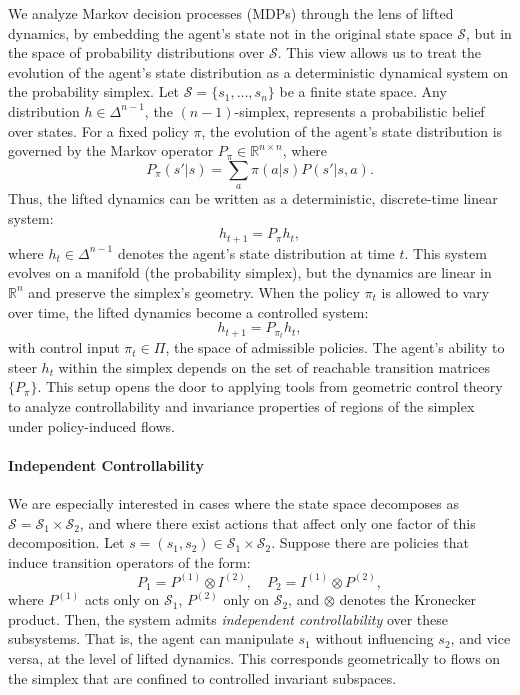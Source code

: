 \documentclass{article}
\theoremstyle{plain}
\theoremstyle{definition}
\theoremstyle{remark}
\begin{document}
We analyze Markov decision processes (MDPs) through the lens of lifted dynamics, by embedding the agent's state not in the original state space \( \mathcal{S} \), but in the space of probability distributions over \( \mathcal{S} \). This view allows us to treat the evolution of the agent's state distribution as a deterministic dynamical system on the probability simplex.
Let \( \mathcal{S} = \{s_1, \dots, s_n\} \) be a finite state space. Any distribution \( h \in \Delta^{n-1} \), the \( (n-1) \)-simplex, represents a probabilistic belief over states. For a fixed policy \( \pi \), the evolution of the agent's state distribution is governed by the Markov operator \( P_\pi \in \mathbb{R}^{n \times n} \), where
\begin{equation}
    P_\pi(s'|s) = \sum_a \pi(a|s) P(s'|s,a).
\end{equation}
Thus, the lifted dynamics can be written as a deterministic, discrete-time linear system:
\begin{equation}
    h_{t+1} = P_\pi h_t,
\end{equation}
where \( h_t \in \Delta^{n-1} \) denotes the agent's state distribution at time \( t \).
This system evolves on a manifold (the probability simplex), but the dynamics are linear in \( \mathbb{R}^n \) and preserve the simplex's geometry.
When the policy \( \pi_t \) is allowed to vary over time, the lifted dynamics become a controlled system:
\begin{equation}
    h_{t+1} = P_{\pi_t} h_t,
\end{equation}
with control input \( \pi_t \in \Pi \), the space of admissible policies. The agent's ability to steer \( h_t \) within the simplex depends on the set of reachable transition matrices \( \{P_\pi\} \).
This setup opens the door to applying tools from geometric control theory to analyze controllability and invariance properties of regions of the simplex under policy-induced flows.

\paragraph{Independent Controllability}

We are especially interested in cases where the state space decomposes as \( \mathcal{S} = \mathcal{S}_1 \times \mathcal{S}_2 \), and where there exist actions that affect only one factor of this decomposition. Let \( s = (s_1, s_2) \in \mathcal{S}_1 \times \mathcal{S}_2 \).
Suppose there are policies that induce transition operators of the form:
\begin{equation}
    P_1 = P^{(1)} \otimes I^{(2)}, \quad P_2 = I^{(1)} \otimes P^{(2)},
\end{equation}
where \( P^{(1)} \) acts only on \( \mathcal{S}_1 \), \( P^{(2)} \) only on \( \mathcal{S}_2 \), and \( \otimes \) denotes the Kronecker product. Then, the system admits \emph{independent controllability} over these subsystems. That is, the agent can manipulate \( s_1 \) without influencing \( s_2 \), and vice versa, at the level of lifted dynamics.
This corresponds geometrically to flows on the simplex that are confined to controlled invariant subspaces.
\end{document}
